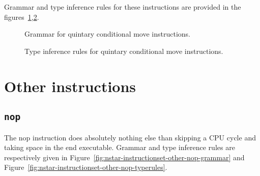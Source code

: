 Grammar and type inference rules for these instructions are provided in the figures~\ref{fig:nstar-instructionset-registers-cmvX-quintary-grammar},\ref{fig:nstar-instructionset-registers-cmvX-quintary-typerules}.

\begin{figure}[H]
	\centering


	\caption{Grammar for quintary conditional move instructions.}
	\label{fig:nstar-instructionset-registers-cmvX-quintary-grammar}
\end{figure}

\begin{figure}[H]
	\centering


	\caption{Type inference rules for quintary conditional move instructions.}
	\label{fig:nstar-instructionset-registers-cmvX-quintary-typerules}
\end{figure}


\section{Other instructions}\label{sec:nstar-instructionset-other}

\subsection{\texttt{nop}}\label{subsec:nstar-instructionset-other-nop}

The {\Iformat nop} instruction does absolutely nothing else than skipping a CPU cycle and taking space in the end executable.
Grammar and type inference rules are respectively given in Figure~\ref{fig:nstar-instructionset-other-nop-grammar} and Figure~\ref{fig:nstar-instructionset-other-nop-typerules}.

